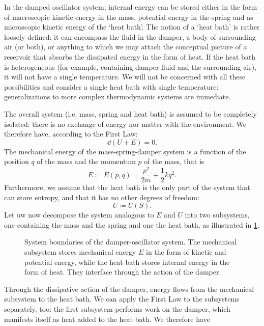 In the damped oscillator system, internal energy can be stored either in the form of macroscopic kinetic energy in the mass, potential energy in the spring and as microscopic kinetic energy of the `heat bath'. The notion of a `heat bath' is rather loosely defined: it can encompass the fluid in the damper, a body of surrounding air (or both), or anything to which we may attach the conceptual picture of a reservoir that absorbs the dissipated energy in the form of heat. If the heat bath is heterogeneous (for example, containing damper fluid and the surrounding air), it will not have a single temperature. We will not be concerned with all these possibilities and consider a single heat bath with single temperature: generalizations to more complex thermodynamic systems are immediate.

The overall system (i.e. mass, spring and heat bath) is assumed to be completely isolated: there is no exchange of energy nor matter with the environment. We therefore have, according to the First Law:
\begin{equation}
    \dd{(U + E)} = 0. 
    \label{eq:dho_first_law}
\end{equation}
The mechanical energy of the mass-spring-damper system is a function of the position $q$ of the mass and the momentum $p$ of the mass, that is
\begin{equation}
    E \coloneq E(p, q) = \frac{p^2}{2m} + \frac{1}{2}kq^2. 
    \label{eq:dho_mech_energy}
\end{equation}
Furthermore, we assume that the heat bath is the only part of the system that can store entropy, and that it has no other degrees of freedom:
\begin{equation}
    U \coloneq U(S).  
    \label{eq:dho_int_energy}
\end{equation}
Let uw now decompose the system analogous to $E$ and $U$ into two subsystems, one containing the mass and the spring and one the heat bath, as illustrated in \cref{fig:oscillator_thermo}. 
\begin{figure}[ht!]
    \centering
    
    \caption{System boundaries of the damper-oscillator system. The mechanical subsystem stores mechanical energy $E$ in the form of kinetic and potential energy, while the heat bath stores internal energy in the form of heat. They interface through the action of the damper.}
    \label{fig:oscillator_thermo}
\end{figure}
Through the dissipative action of the damper, energy flows from the mechanical subsystem to the heat bath. We can apply the First Law to the subsystems separately, too: the first subsystem performs work on the damper, which manifests itself as heat added to the heat bath. We therefore have
